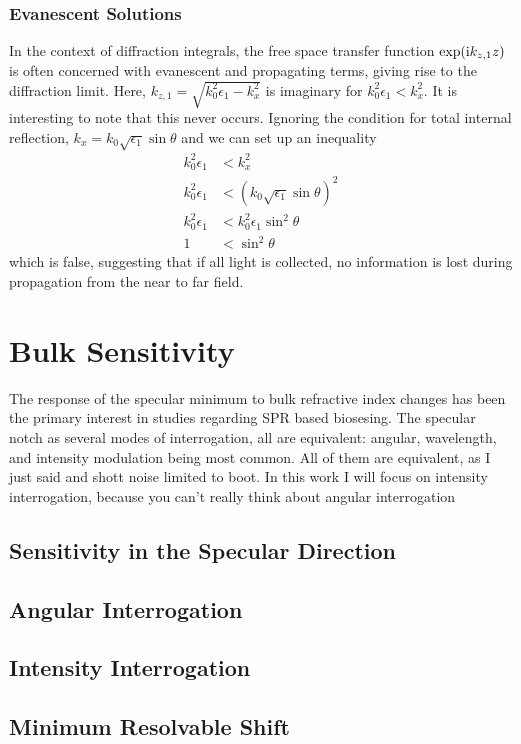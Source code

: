 \documentclass[a4paper,titlepage,onecolumn]{report}
\begin{document}
\subsubsection{Evanescent Solutions}
In the context of diffraction integrals, the free space transfer function
$\exp({\mathrm{i}} k_{z,1} z)$ is often concerned with evanescent and propagating
terms, giving rise to the diffraction limit.  Here,
$k_{z,1}=\sqrt{k_0^2 \epsilon_1 - k_x^2}$ is imaginary for $k_0^2
\epsilon_1 < k_x^2$.  It is interesting to note that this never occurs.
Ignoring the condition for total internal reflection, 
$k_x = k_0 \sqrt{\epsilon_1} \sin \theta$ and we can set up an inequality
\begin{align}
k_0^2 \epsilon_1 &< k_x^2\\
k_0^2 \epsilon_1 &< \left(k_0 \sqrt{\epsilon_1} \sin \theta\right)^2\\
k_0^2 \epsilon_1 &< k_0^2 \epsilon_1 \sin^2 \theta\\
1 &< \sin^2 \theta
\end{align}
which is false, suggesting that if all light is collected, no information is
lost during propagation from the near to far field.
\section{Bulk Sensitivity}
The response of the specular minimum to bulk refractive index changes has been the primary interest in studies regarding SPR based biosesing.  The specular notch as several modes of interrogation, all are equivalent: angular, wavelength, and intensity modulation being most common.  All of them are equivalent, as I just said and shott noise limited to boot.  In this work I will focus on intensity interrogation, because you can't really think about angular interrogation


\subsection{Sensitivity in the Specular Direction}

\subsection{Angular Interrogation}
\subsection{Intensity Interrogation}
\subsection{Minimum Resolvable Shift}
\end{document}
